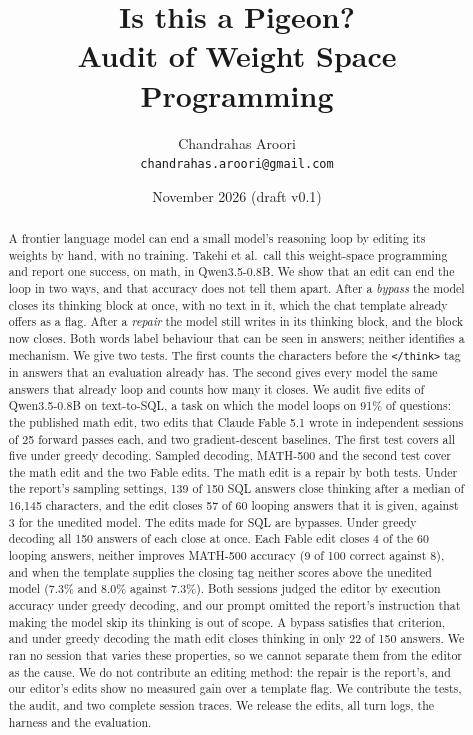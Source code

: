 \documentclass[11pt]{article}
\title{Is this a Pigeon?\\Audit of Weight Space Programming}
\author{Chandrahas Aroori\\\small\texttt{chandrahas.aroori@gmail.com}}
\date{November 2026 \quad (draft v0.1)}
\newcommand{\think}{\texttt{</think>}}
\newcommand{\Qwen}{Qwen3.5-0.8B}
\begin{document}
\maketitle

\begin{abstract}
A frontier language model can end a small model's reasoning loop by editing its weights by hand, with no training. Takehi et al.\ call this weight-space programming and report one success, on math, in \Qwen{}.
We show that an edit can end the loop in two ways, and that accuracy does not tell them apart.
After a \emph{bypass} the model closes its thinking block at once, with no text in it, which the chat template already offers as a flag.
After a \emph{repair} the model still writes in its thinking block, and the block now closes.
Both words label behaviour that can be seen in answers; neither identifies a mechanism.
We give two tests. The first counts the characters before the \think{} tag in answers that an evaluation already has. The second gives every model the same answers that already loop and counts how many it closes.
We audit five edits of \Qwen{} on text-to-SQL, a task on which the model loops on 91\% of questions: the published math edit, two edits that Claude Fable 5.1 wrote in independent sessions of 25 forward passes each, and two gradient-descent baselines. The first test covers all five under greedy decoding. Sampled decoding, MATH-500 and the second test cover the math edit and the two Fable edits.
The math edit is a repair by both tests. Under the report's sampling settings, 139 of 150 SQL answers close thinking after a median of 16,145 characters, and the edit closes 57 of 60 looping answers that it is given, against 3 for the unedited model.
The edits made for SQL are bypasses. Under greedy decoding all 150 answers of each close at once. Each Fable edit closes 4 of the 60 looping answers, neither improves MATH-500 accuracy (9 of 100 correct against 8), and when the template supplies the closing tag neither scores above the unedited model (7.3\% and 8.0\% against 7.3\%).
Both sessions judged the editor by execution accuracy under greedy decoding, and our prompt omitted the report's instruction that making the model skip its thinking is out of scope. A bypass satisfies that criterion, and under greedy decoding the math edit closes thinking in only 22 of 150 answers. We ran no session that varies these properties, so we cannot separate them from the editor as the cause.
We do not contribute an editing method: the repair is the report's, and our editor's edits show no measured gain over a template flag. We contribute the tests, the audit, and two complete session traces.
We release the edits, all turn logs, the harness and the evaluation.
\end{abstract}
\end{document}
